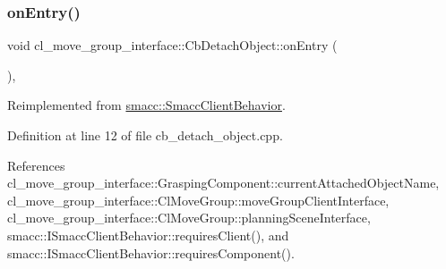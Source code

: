 \subsubsection{\texorpdfstring{on\+Entry()}{onEntry()}}
{\footnotesize\ttfamily void cl\+\_\+move\+\_\+group\+\_\+interface\+::\+Cb\+Detach\+Object\+::on\+Entry (\begin{DoxyParamCaption}{ }\end{DoxyParamCaption})\hspace{0.3cm}{\ttfamily [override]}, {\ttfamily [virtual]}}



Reimplemented from \hyperlink{classsmacc_1_1SmaccClientBehavior_ad5d3e1f1697c3cfe66c94cadba948493}{smacc\+::\+Smacc\+Client\+Behavior}.



Definition at line 12 of file cb\+\_\+detach\+\_\+object.\+cpp.



References cl\+\_\+move\+\_\+group\+\_\+interface\+::\+Grasping\+Component\+::current\+Attached\+Object\+Name, cl\+\_\+move\+\_\+group\+\_\+interface\+::\+Cl\+Move\+Group\+::move\+Group\+Client\+Interface, cl\+\_\+move\+\_\+group\+\_\+interface\+::\+Cl\+Move\+Group\+::planning\+Scene\+Interface, smacc\+::\+I\+Smacc\+Client\+Behavior\+::requires\+Client(), and smacc\+::\+I\+Smacc\+Client\+Behavior\+::requires\+Component().


